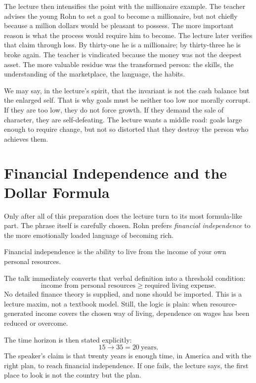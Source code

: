 The lecture then intensifies the point with the millionaire example. The teacher advises the young Rohn to set a goal to become a millionaire, but not chiefly because a million dollars would be pleasant to possess. The more important reason is what the process would require him to become. The lecture later verifies that claim through loss. By thirty-one he is a millionaire; by thirty-three he is broke again. The teacher is vindicated because the money was not the deepest asset. The more valuable residue was the transformed person: the skills, the understanding of the marketplace, the language, the habits.

We may say, in the lecture's spirit, that the invariant is not the cash balance but the enlarged self. That is why goals must be neither too low nor morally corrupt. If they are too low, they do not force growth. If they demand the sale of character, they are self-defeating. The lecture wants a middle road: goals large enough to require change, but not so distorted that they destroy the person who achieves them.

\section{Financial Independence and the Dollar Formula}

Only after all of this preparation does the lecture turn to its most formula-like part. The phrase itself is carefully chosen. Rohn prefers \emph{financial independence} to the more emotionally loaded language of becoming rich.

\begin{definition}
Financial independence is the ability to live from the income of your own personal resources.
\end{definition}

The talk immediately converts that verbal definition into a threshold condition:
\begin{equation}
\text{income from personal resources} \ge \text{required living expense}.
\end{equation}
No detailed finance theory is supplied, and none should be imported. This is a lecture maxim, not a textbook model. Still, the logic is plain: when resource-generated income covers the chosen way of living, dependence on wages has been reduced or overcome.

The time horizon is then stated explicitly:
\begin{equation}
15 \to 35 = 20\ \text{years}.
\end{equation}
The speaker's claim is that twenty years is enough time, in America and with the right plan, to reach financial independence. If one fails, the lecture says, the first place to look is not the country but the plan.

